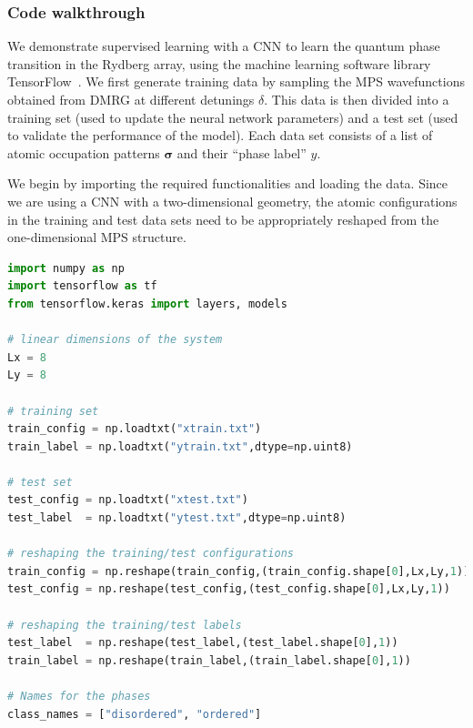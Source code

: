 \documentclass[twocolumn,english,reprint,superscriptaddress,longbibliography,pra]{revtex4-1}
\begin{document}
\subsubsection*{Code walkthrough}
We demonstrate supervised learning with a CNN to learn the quantum phase transition in the Rydberg array, using the machine learning software library TensorFlow~\cite{tensorflow}. We first generate training data by sampling the MPS wavefunctions obtained from DMRG at different detunings $\delta$. This data is then divided into a training set (used to update the neural network parameters) and a test set (used to validate the performance of the model). Each data set consists of a list of atomic occupation patterns $\bm\sigma$ and their ``phase label'' $y$.

We begin by importing the required functionalities and loading the data. Since we are using a CNN with a two-dimensional geometry, the atomic configurations in the training and test data sets need to be appropriately reshaped from the one-dimensional MPS structure.
\begin{lstlisting}[language=Python,numbers=none]
import numpy as np
import tensorflow as tf
from tensorflow.keras import layers, models

# linear dimensions of the system
Lx = 8
Ly = 8

# training set
train_config = np.loadtxt("xtrain.txt") 
train_label = np.loadtxt("ytrain.txt",dtype=np.uint8)

# test set
test_config = np.loadtxt("xtest.txt")
test_label  = np.loadtxt("ytest.txt",dtype=np.uint8)

# reshaping the training/test configurations
train_config = np.reshape(train_config,(train_config.shape[0],Lx,Ly,1))
test_config = np.reshape(test_config,(test_config.shape[0],Lx,Ly,1))

# reshaping the training/test labels
test_label  = np.reshape(test_label,(test_label.shape[0],1))
train_label = np.reshape(train_label,(train_label.shape[0],1))

# Names for the phases  
class_names = ["disordered", "ordered"]
\end{lstlisting}
\end{document}
